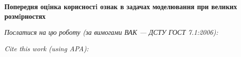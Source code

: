 \documentclass[a4paper,14pt,article]{memoir}
\newcommand{\articleTitleUkr}{
	Попередня оцiнка корисностi ознак в задачах моделювання при великих розмiрностях}
\begin{document}
	
	\begin{center}
		\par\textbf{\MakeUppercase\articleTitleUkr}
		\par\textbf{\authorFullNameUkr}
	\end{center}
	
	\par\bigskip\textit{Послатися на цю роботу (за вимогами ВАК --- ДСТУ ГОСТ 7.1:2006):}
	\par{}
	\par\bigskip\textit{Cite this work (using APA):}
	\par{}
	
	
\end{document}
